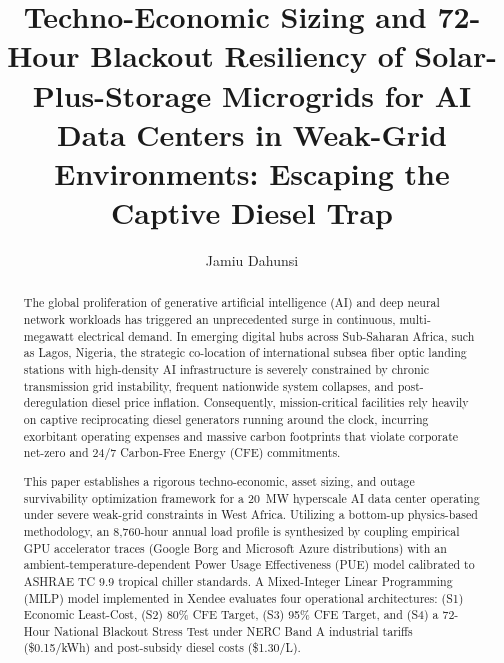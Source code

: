 \documentclass[12pt,3p,review]{elsarticle}
\begin{document}
\begin{frontmatter}

\title{Techno-Economic Sizing and 72-Hour Blackout Resiliency of Solar-Plus-Storage Microgrids for AI Data Centers in Weak-Grid Environments: Escaping the Captive Diesel Trap}

\author[inst1]{Jamiu Dahunsi}


\begin{abstract}
The global proliferation of generative artificial intelligence (AI) and deep neural network workloads has triggered an unprecedented surge in continuous, multi-megawatt electrical demand. In emerging digital hubs across Sub-Saharan Africa, such as Lagos, Nigeria, the strategic co-location of international subsea fiber optic landing stations with high-density AI infrastructure is severely constrained by chronic transmission grid instability, frequent nationwide system collapses, and post-deregulation diesel price inflation. Consequently, mission-critical facilities rely heavily on captive reciprocating diesel generators running around the clock, incurring exorbitant operating expenses and massive carbon footprints that violate corporate net-zero and 24/7 Carbon-Free Energy (CFE) commitments.

This paper establishes a rigorous techno-economic, asset sizing, and outage survivability optimization framework for a 20~MW hyperscale AI data center operating under severe weak-grid constraints in West Africa. Utilizing a bottom-up physics-based methodology, an 8,760-hour annual load profile is synthesized by coupling empirical GPU accelerator traces (Google Borg and Microsoft Azure distributions) with an ambient-temperature-dependent Power Usage Effectiveness (PUE) model calibrated to ASHRAE TC 9.9 tropical chiller standards. A Mixed-Integer Linear Programming (MILP) model implemented in Xendee evaluates four operational architectures: (S1) Economic Least-Cost, (S2) 80\% CFE Target, (S3) 95\% CFE Target, and (S4) a 72-Hour National Blackout Stress Test under NERC Band A industrial tariffs (\$0.15/kWh) and post-subsidy diesel costs (\$1.30/L).


\end{abstract}
\end{frontmatter}
\end{document}
